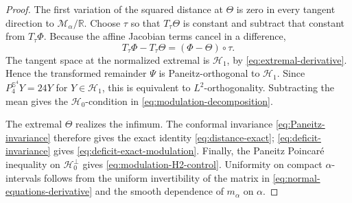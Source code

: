 \documentclass[11pt]{article}
\numberwithin{equation}{section}
\begin{document}
\begin{proof}
The first variation of the squared distance at \(\Theta\) is zero in every
tangent direction to \(\mathcal M_{\alpha}/\mathbb R\). Choose \(\tau\) so that
\(T_\tau\Theta\) is constant and subtract that constant from \(T_\tau\Phi\).
Because the affine Jacobian terms cancel in a difference,
\[
T_\tau\Phi-T_\tau\Theta=(\Phi-\Theta)\circ\tau.
\]
The tangent space at the normalized extremal is \(\mathcal H_1\), by
\eqref{eq:extremal-derivative}. Hence the transformed remainder \(\Psi\) is
Paneitz-orthogonal to \(\mathcal H_1\). Since
\(P_{4}^{\mathbb S^{4}}Y=24Y\) for \(Y\in\mathcal H_1\), this is equivalent to
\(L^{2}\)-orthogonality. Subtracting the mean gives the
\(\mathcal H_0\)-condition in \eqref{eq:modulation-decomposition}.

The extremal \(\Theta\) realizes the infimum. The conformal invariance
\eqref{eq:Paneitz-invariance} therefore gives the exact identity
\eqref{eq:distance-exact}; \eqref{eq:deficit-invariance} gives
\eqref{eq:deficit-exact-modulation}. Finally, the Paneitz Poincar\'e inequality
on \(\mathcal H_0^{\perp}\) gives \eqref{eq:modulation-H2-control}. Uniformity on
compact \(\alpha\)-intervals follows from the uniform invertibility of the
matrix in \eqref{eq:normal-equations-derivative} and the smooth dependence of
\(m_\alpha\) on \(\alpha\).
\end{proof}
\end{document}
